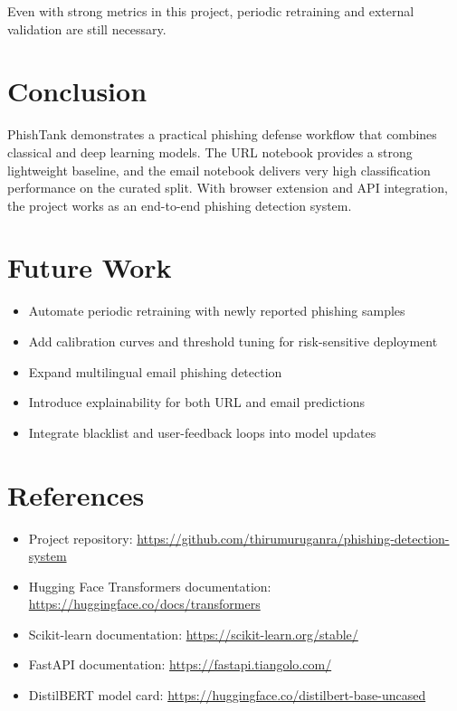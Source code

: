 \documentclass[12pt]{article}
\begin{document}
Even with strong metrics in this project, periodic retraining and external validation are still necessary.

\section{Conclusion}
PhishTank demonstrates a practical phishing defense workflow that combines classical and deep learning models. The URL notebook provides a strong lightweight baseline, and the email notebook delivers very high classification performance on the curated split. With browser extension and API integration, the project works as an end-to-end phishing detection system.

\section{Future Work}
\begin{itemize}
    \item Automate periodic retraining with newly reported phishing samples
    \item Add calibration curves and threshold tuning for risk-sensitive deployment
    \item Expand multilingual email phishing detection
    \item Introduce explainability for both URL and email predictions
    \item Integrate blacklist and user-feedback loops into model updates
\end{itemize}

\section{References}
\begin{itemize}
    \item Project repository: \url{https://github.com/thirumuruganra/phishing-detection-system}
    \item Hugging Face Transformers documentation: \url{https://huggingface.co/docs/transformers}
    \item Scikit-learn documentation: \url{https://scikit-learn.org/stable/}
    \item FastAPI documentation: \url{https://fastapi.tiangolo.com/}
    \item DistilBERT model card: \url{https://huggingface.co/distilbert-base-uncased}
\end{itemize}
\end{document}
